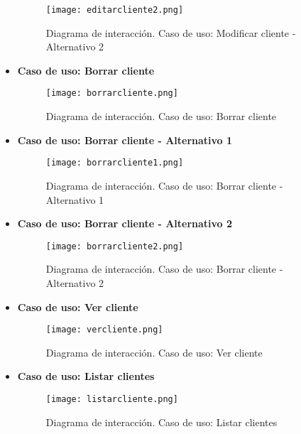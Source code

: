 \begin{itemize}
\begin{figure}[!htb]
  \centering
    \texttt{[image: editarcliente2.png]}
  \caption{Diagrama de interacción. Caso de uso: Modificar cliente - Alternativo 2}
  \label{a}
\end{figure}

\newpage
\item \textbf{Caso de uso: Borrar cliente}
\begin{figure}[!htb]
  \centering
    \texttt{[image: borrarcliente.png]}
  \caption{Diagrama de interacción. Caso de uso: Borrar cliente}
  \label{a}
\end{figure}

\item \textbf{Caso de uso: Borrar cliente - Alternativo 1}
\begin{figure}[!htb]
  \centering
    \texttt{[image: borrarcliente1.png]}
  \caption{Diagrama de interacción. Caso de uso: Borrar cliente - Alternativo 1}
  \label{a}
\end{figure}
\clearpage
\item \textbf{Caso de uso: Borrar cliente - Alternativo 2}
\begin{figure}[!htb]
  \centering
    \texttt{[image: borrarcliente2.png]}
  \caption{Diagrama de interacción. Caso de uso: Borrar cliente - Alternativo 2}
  \label{a}
\end{figure}

\item \textbf{Caso de uso: Ver cliente}
\begin{figure}[!htb]
  \centering
    \texttt{[image: vercliente.png]}
  \caption{Diagrama de interacción. Caso de uso: Ver cliente}
  \label{a}
\end{figure}

\item \textbf{Caso de uso: Listar clientes}
\begin{figure}[!htb]
  \centering
    \texttt{[image: listarcliente.png]}
  \caption{Diagrama de interacción. Caso de uso: Listar clientes}
  \label{a}
\end{figure}
\newpage


\end{itemize}
